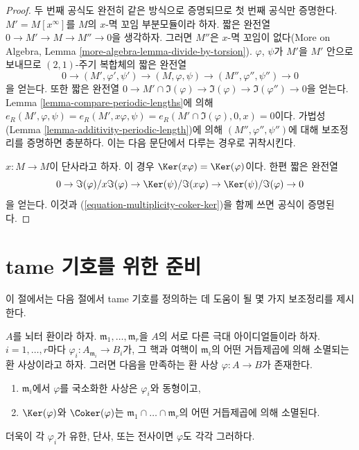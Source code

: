\begin{proof}
두 번째 공식도 완전히 같은 방식으로 증명되므로 첫 번째 공식만
증명한다. $M' = M[x^\infty]$를 $M$의 $x$-멱 꼬임 부분모듈이라 하자.
짧은 완전열 $0 \to M' \to M \to M'' \to 0$을 생각하자. 그러면
$M''$은 $x$-멱 꼬임이 없다(More on Algebra, Lemma
\ref{more-algebra-lemma-divide-by-torsion}). $\varphi$, $\psi$가 $M'$을
$M'$ 안으로 보내므로 $(2, 1)$-주기 복합체의 짧은 완전열
$$
0 \to (M', \varphi', \psi') \to (M, \varphi, \psi) \to
(M'', \varphi'', \psi'') \to 0
$$
을 얻는다. 또한 짧은 완전열
$0 \to M' \cap \Im(\varphi) \to \Im(\varphi) \to \Im(\varphi'') \to 0$을
얻는다. Lemma \ref{lemma-compare-periodic-lengths}에 의해
$e_R(M', \varphi, \psi) = e_R(M', x\varphi, \psi) =
e_R(M' \cap \Im(\varphi), 0, x) = 0$이다. 가법성(Lemma
\ref{lemma-additivity-periodic-length})에 의해
$(M'', \varphi'', \psi'')$에 대해 보조정리를 증명하면 충분하다.
이는 다음 문단에서 다루는 경우로 귀착시킨다.

\medskip\noindent
$x : M \to M$이 단사라고 하자. 이 경우
$\Ker(x\varphi) = \Ker(\varphi)$이다. 한편 짧은 완전열
$$
0 \to \Im(\varphi)/x\Im(\varphi) \to
\Ker(\psi)/\Im(x\varphi) \to \Ker(\psi)/\Im(\varphi) \to 0
$$
을 얻는다. 이것과 (\ref{equation-multiplicity-coker-ker})을 함께 쓰면
공식이 증명된다.
\end{proof}






\section{tame 기호를 위한 준비}
\label{section-preparation-tame-symbol}

\noindent
이 절에서는 다음 절에서 tame 기호를 정의하는 데 도움이 될 몇 가지
보조정리를 제시한다.

\begin{lemma}
\label{lemma-glue-at-max}
$A$를 뇌터 환이라 하자. $\mathfrak m_1, \ldots, \mathfrak m_r$을
$A$의 서로 다른 극대 아이디얼들이라 하자. $i = 1, \ldots, r$마다
$\varphi_i : A_{\mathfrak m_i} \to B_i$가, 그 핵과 여핵이
$\mathfrak m_i$의 어떤 거듭제곱에 의해 소멸되는 환 사상이라고 하자.
그러면 다음을 만족하는 환 사상 $\varphi : A \to B$가 존재한다.
\begin{enumerate}
\item $\mathfrak m_i$에서 $\varphi$를 국소화한 사상은
$\varphi_i$와 동형이고,
\item $\Ker(\varphi)$와 $\Coker(\varphi)$는
$\mathfrak m_1 \cap \ldots \cap \mathfrak m_r$의 어떤 거듭제곱에 의해
소멸된다.
\end{enumerate}
더욱이 각 $\varphi_i$가 유한, 단사, 또는 전사이면 $\varphi$도 각각
그러하다.
\end{lemma}

